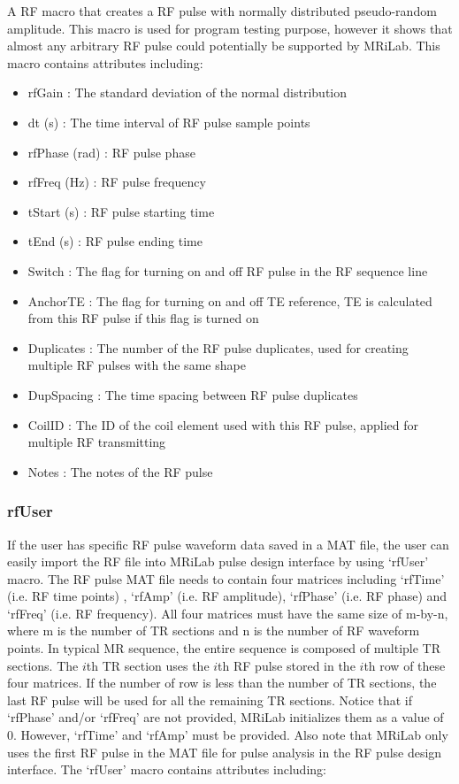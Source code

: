 \documentclass{book}%
\begin{document}
A RF macro that creates a RF pulse with normally distributed pseudo-random amplitude. This macro is used for program testing purpose, however it shows that almost any arbitrary RF pulse could potentially be supported by MRiLab. This macro contains attributes including:

\begin{itemize}
	\item rfGain : The standard deviation of the normal distribution
	\item dt (s) : The time interval of RF pulse sample points
	\item rfPhase (rad) : RF pulse phase
	\item rfFreq (Hz) : RF pulse frequency
	\item tStart (s) : RF pulse starting time
	\item tEnd (s) : RF pulse ending time
	\item Switch : The flag for turning on and off RF pulse in the RF sequence line
	\item AnchorTE : The flag for turning on and off TE reference, TE is calculated from this RF pulse if this flag is turned on
	\item Duplicates : The number of the RF pulse duplicates, used for creating multiple RF pulses with the same shape
	\item DupSpacing : The time spacing between RF pulse duplicates
	\item CoilID : The ID of the coil element used with this RF pulse, applied for multiple RF transmitting
	\item Notes : The notes of the RF pulse 
\end{itemize}

\subsubsection{rfUser}

If the user has specific RF pulse waveform data saved in a MAT file, the user can easily import the RF file into MRiLab pulse design interface by using `rfUser' macro. The RF pulse MAT file needs to contain four matrices including `rfTime' (i.e. RF time points) , `rfAmp' (i.e. RF amplitude), `rfPhase' (i.e. RF phase) and `rfFreq' (i.e. RF frequency). All four matrices must have the same size of m-by-n, where m is the number of TR sections and n is the number of RF waveform points. In typical MR sequence, the entire sequence is composed of multiple TR sections. The $i$th TR section uses the $i$th RF pulse stored in the $i$th row of these four matrices. If the number of row is less than the number of TR sections, the last RF pulse will be used for all the remaining TR sections. Notice that if `rfPhase' and/or `rfFreq' are not provided, MRiLab initializes them as a value of 0. However, `rfTime' and `rfAmp' must be provided. Also note that MRiLab only uses the first RF pulse in the MAT file for pulse analysis in the RF pulse design interface. The `rfUser' macro contains attributes including:
\end{document}

